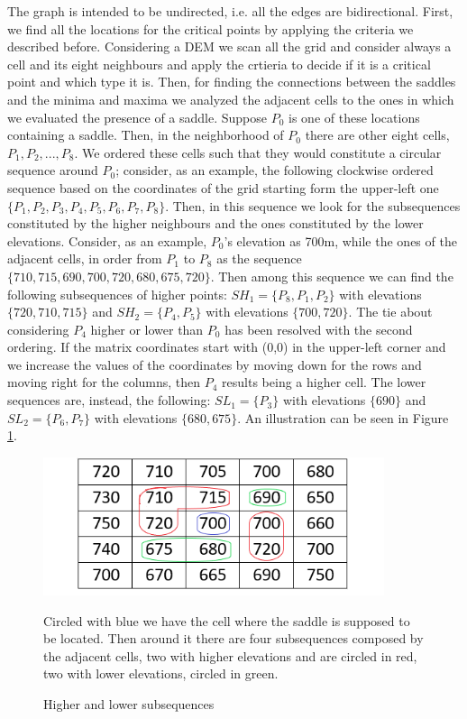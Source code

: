 The graph is intended to be undirected, i.e. all the edges are bidirectional.  First, we find all the locations for the critical points by applying the criteria we described before. Considering a DEM we scan all the grid and consider always a cell and its eight neighbours and apply the crtieria to decide if it is a critical point and which type it is. Then, for finding the connections between the saddles and the minima and maxima we analyzed the adjacent cells to the ones in which we evaluated the presence of a saddle. Suppose \(P_0\) is one of these locations containing a saddle. Then, in the neighborhood of \(P_0\) there are other eight cells, \(P_1,P_2,...,P_8\). We ordered these cells such that they would constitute a circular sequence around \(P_0\); consider, as an example, the following clockwise ordered sequence based on the coordinates of the grid starting form the upper-left one \(\{P_1,P_2,P_3,P_4,P_5,P_6,P_7,P_8\}\). Then, in this sequence we look for the subsequences constituted by the higher neighbours and the ones constituted by the lower elevations.
Consider, as an example, \(P_0\)'s elevation as 700m, while the ones of the adjacent cells, in order from \(P_1\) to \(P_8\) as the sequence \(\{710,715,690,700,720,680,675,720\}\). Then among this sequence we can find the following subsequences of higher points: \(SH_1 = \{P_8,P_1,P_2\}\) with elevations \(\{720,710,715\}\) and \(SH_2 = \{P_4,P_5\}\) with elevations \(\{700,720\}\). The tie about considering \(P_4\) higher or lower than \(P_0\)  has been resolved with the second ordering. If the matrix coordinates start with (0,0) in the upper-left corner and we increase the values of the coordinates by moving down for the rows and moving right for the columns, then \(P_4\) results being a higher cell. The lower sequences are, instead, the following: \(SL_1 = \{P_3\}\) with elevations \(\{690\}\) and \(SL_2 = \{P_6,P_7\}\) with elevations \(\{680,675\}\).
An illustration can be seen in Figure \ref{fig:squences}.

\begin{figure} 
\centering
\includegraphics[width=10cm]{pictures/sequences.png}
\caption{Higher and lower subsequences}
Circled with blue we have the cell where the saddle is supposed to be located. Then around it there are four subsequences composed by the adjacent cells, two with higher elevations and are circled in red, two with lower elevations, circled in green.
\label{fig:squences}
\end{figure}


